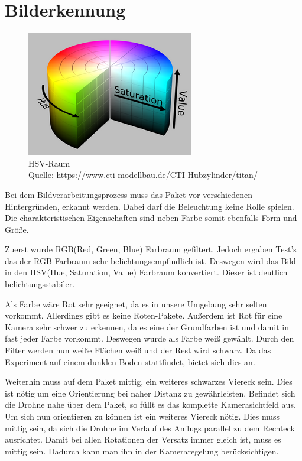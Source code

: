 \chapter{Bilderkennung}
\begin{figure}[h]
	\centering
	\includegraphics[scale=0.5]{"Grafiken/hsv_colorspace_zoom34.png"}
	\caption{HSV-Raum \\Quelle: https://www.cti-modellbau.de/CTI-Hubzylinder/titan/}
	\label{fig:meine-grafik}
\end{figure}
Bei dem Bildverarbeitungsprozess muss das Paket vor verschiedenen Hintergründen, erkannt werden. Dabei darf die Beleuchtung keine Rolle spielen. Die charakteristischen Eigenschaften sind neben Farbe somit ebenfalls Form und Größe.

Zuerst wurde RGB(Red, Green, Blue) Farbraum gefiltert. Jedoch ergaben Test's das der RGB-Farbraum sehr belichtungsempfindlich ist. Deswegen wird das Bild in den HSV(Hue, Saturation, Value) Farbraum konvertiert. Dieser ist deutlich belichtungsstabiler.

Als Farbe wäre Rot sehr geeignet, da es in unsere Umgebung sehr selten vorkommt. Allerdings gibt es keine Roten-Pakete. Außerdem ist Rot für eine Kamera sehr schwer zu erkennen, da es eine der Grundfarben ist und damit in fast jeder Farbe vorkommt. Deswegen wurde als Farbe weiß gewählt. Durch den Filter werden nun weiße Flächen weiß und der Rest wird schwarz. Da das Experiment auf einem dunklen Boden stattfindet, bietet sich dies an.

Weiterhin muss auf dem Paket mittig, ein weiteres schwarzes Viereck sein. Dies ist nötig um eine Orientierung bei naher Distanz zu gewährleisten. Befindet sich die Drohne nahe über dem Paket, so füllt es das komplette Kamerasichtfeld aus. Um sich nun orientieren zu können ist ein weiteres Viereck nötig. Dies muss mittig sein, da sich die Drohne im Verlauf des Anflugs parallel zu dem Rechteck ausrichtet. Damit bei allen Rotationen der Versatz immer gleich ist, muss es mittig sein. Dadurch kann man ihn in der Kameraregelung berücksichtigen.

